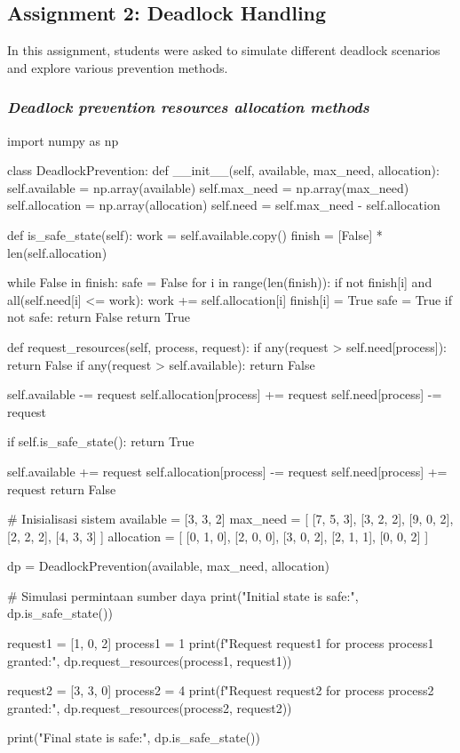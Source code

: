 \documentclass[12pt]{article}
\begin{document}
\subsection{Assignment 2: Deadlock Handling}
In this assignment, students were asked to simulate different deadlock
scenarios and explore various prevention methods.

\subsubsection{\textit{Deadlock prevention resources allocation methods}}
\begin{python}
    import numpy as np

    class DeadlockPrevention:
    def __init__(self, available, max_need, allocation):
        self.available = np.array(available)
        self.max_need = np.array(max_need)
        self.allocation = np.array(allocation)
        self.need = self.max_need - self.allocation

    def is_safe_state(self):
        work = self.available.copy()
        finish = [False] * len(self.allocation)
        
        while False in finish:
            safe = False
            for i in range(len(finish)):
                if not finish[i] and all(self.need[i] <= work):
                    work += self.allocation[i]
                    finish[i] = True
                    safe = True
            if not safe:
                return False
        return True

    def request_resources(self, process, request):
        if any(request > self.need[process]):
            return False
        if any(request > self.available):
            return False
        
        self.available -= request
        self.allocation[process] += request
        self.need[process] -= request
        
        if self.is_safe_state():
            return True
        
        self.available += request
        self.allocation[process] -= request
        self.need[process] += request
        return False

    # Inisialisasi sistem
    available = [3, 3, 2]
    max_need = [
    [7, 5, 3],
    [3, 2, 2],
    [9, 0, 2],
    [2, 2, 2],
    [4, 3, 3]
    ]
    allocation = [
    [0, 1, 0],
    [2, 0, 0],
    [3, 0, 2],
    [2, 1, 1],
    [0, 0, 2]
    ]

    dp = DeadlockPrevention(available, max_need, allocation)

    # Simulasi permintaan sumber daya
    print("Initial state is safe:", dp.is_safe_state())

    request1 = [1, 0, 2]
    process1 = 1
    print(f"Request {request1} for process {process1} granted:", dp.request_resources(process1, request1))
    
    request2 = [3, 3, 0]
    process2 = 4
    print(f"Request {request2} for process {process2} granted:", dp.request_resources(process2, request2))
    
    print("Final state is safe:", dp.is_safe_state())
    
\end{python}
\end{document}
